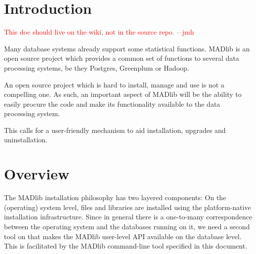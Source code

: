\documentclass[11pt]{article}
\newcommand{\versionnumber}{0.2}
\newcommand{\jmh}[1]{{\textcolor{red}{#1 -- jmh}}}
\begin{document}
{
\noindent\hspace*{\centeroffset}

\noindent\makebox[0pt][l]
{\begin{minipage}{\textwidth}
\flushright
Version~\versionnumber{}
\end{minipage}}

\newpage

\tableofcontents
\newpage

\section{Introduction}
\jmh{This doc should live on the wiki, not in the source repo.}

Many database systems already support some statistical functions. MADlib is an open source project which provides a common set of functions to several data processing systems, be they Postgres, Greenplum or Hadoop.

An open source project which is hard to install, manage and use is not a compelling one. As such, an important aspect of MADlib will be the ability to easily procure the code and make its functionality available to the data processing system.

This calls for a user-friendly mechanism to aid installation, upgrades and uninstallation.

\ifx\pdfoutput\undefined %
\else
{}
\fi
\section{Overview}

The MADlib installation philosophy has two layered components: On the (operating) system level, files and libraries are installed using the platform-native installation infrastructure. Since in general there is a one-to-many correspondence between the operating system and the databases running on it, we need a second tool on that makes the MADlib user-level API available on the database level. This is facilitated by the MADlib command-line tool specified in this document. 

}
\end{document}
